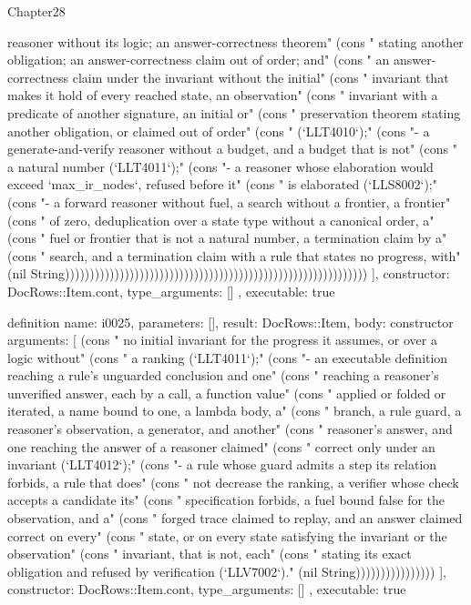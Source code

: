 \begin{lexlean}{Chapter28}
\begin{semanticmodule}
{{reasoner without its logic; an answer-correctness theorem" (cons "  stating another obligation; an answer-correctness claim out of order; and" (cons "  an answer-correctness claim under the invariant without the initial" (cons "  invariant that makes it hold of every reached state, an observation" (cons "  invariant with a predicate of another signature, an initial or" (cons "  preservation theorem stating another obligation, or claimed out of order" (cons "  (`LLT4010`);" (cons "- a generate-and-verify reasoner without a budget, and a budget that is not" (cons "  a natural number (`LLT4011`);" (cons "- a reasoner whose elaboration would exceed `max_ir_nodes`, refused before it" (cons "  is elaborated (`LLS8002`);" (cons "- a forward reasoner without fuel, a search without a frontier, a frontier" (cons "  of zero, deduplication over a state type without a canonical order, a" (cons "  fuel or frontier that is not a natural number, a termination claim by a" (cons "  search, and a termination claim with a rule that states no progress, with" (nil String)))))))))))))))))))))))))))))))))))))))))))))))))))))))))))))
    ],
    constructor: DocRows::Item.cont,
    type_arguments: []
  },
  executable: true
}

definition{
  name: i0025,
  parameters: [],
  result: DocRows::Item,
  body: constructor{
    arguments: [
      (cons "  no initial invariant for the progress it assumes, or over a logic without" (cons "  a ranking (`LLT4011`);" (cons "- an executable definition reaching a rule's unguarded conclusion and one" (cons "  reaching a reasoner's unverified answer, each by a call, a function value" (cons "  applied or folded or iterated, a name bound to one, a lambda body, a" (cons "  branch, a rule guard, a reasoner's observation, a generator, and another" (cons "  reasoner's answer, and one reaching the answer of a reasoner claimed" (cons "  correct only under an invariant (`LLT4012`);" (cons "- a rule whose guard admits a step its relation forbids, a rule that does" (cons "  not decrease the ranking, a verifier whose check accepts a candidate its" (cons "  specification forbids, a fuel bound false for the observation, and a" (cons "  forged trace claimed to replay, and an answer claimed correct on every" (cons "  state, or on every state satisfying the invariant or the observation" (cons "  invariant, that is not, each" (cons "  stating its exact obligation and refused by verification (`LLV7002`)." (nil String))))))))))))))))
    ],
    constructor: DocRows::Item.cont,
    type_arguments: []
  },
  executable: true
}


\end{semanticmodule}
\end{lexlean}
